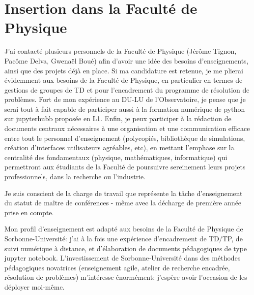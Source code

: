\section{Insertion dans la Facult\'e de Physique}

\pg
J'ai contact\'e plusieurs personnels de la Facult\'e de Physique (J\'er\^ome Tignon, Pac\^ome Delva, Gwena\"el Bou\'e) afin d'avoir une id\'ee des besoins d'enseignements, ainsi que des projets d\'ej\`a en place. Si ma candidature est retenue, je me plierai \'evidemment aux besoins de la Facult\'e de Physique, en particulier en termes de gestions de groupes de TD et pour l'encadrement du programme de r\'esolution de probl\`emes. Fort de mon exp\'erience au DU-LU de l'Observatoire, je pense que je serai tout \`a fait capable de participer aussi \`a la formation num\'erique de python sur jupyterhubb propos\'ee en L1. Enfin, je peux participer \`a la r\'edaction de documents centraux n\'ecessaires \`a une organisation et une communication efficace entre tout le personnel d'enseignement (polycopi\'es, biblioth\`eque de simulations, cr\'eation d'interfaces utilisateurs agr\'eables, etc), en mettant l'emphase sur la centralit\'e des fondamentaux (physique, math\'ematiques, informatique) qui permettront aux \'etudiants de la Facult\'e de poursuivre sereinement leurs projets professionnels, dans la recherche ou l'industrie.

\pg
Je suis conscient de la charge de travail que repr\'esente la t\^ache d'enseignement du statut de ma\^itre de conf\'erences - m\^eme avec la d\'echarge de premi\`ere ann\'ee prise en compte.

\begin{tcolorbox}[colback=green!10, colframe=green!50!black, arc=3mm, boxrule=1pt]
	Mon profil d'enseignement est adapt\'e aux besoins de la Facult\'e de Physique de Sorbonne-Universit\'e: j'ai \`a la fois une exp\'erience d'encadrement de TD/TP, de suivi num\'erique \`a distance, et d'\'elaboration de documents p\'edagogiques de type jupyter notebook. L'investissement de Sorbonne-Universit\'e dans des m\'ethodes p\'edagogiques novatrices (enseignement agile, atelier de recherche encadr\'ee, r\'esolution de probl\`emes) m'int\'eresse \'enorm\'ement: j'esp\`ere avoir l'occasion de les d\'eployer moi-m\^eme.
\end{tcolorbox}







